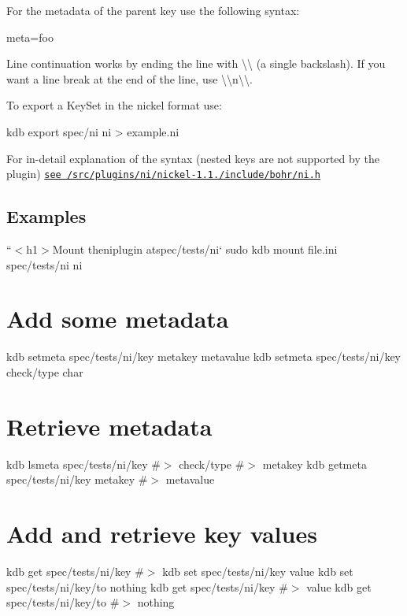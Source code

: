 For the metadata of the parent key use the following syntax\+:


\begin{DoxyCode}
[]
meta=foo
\end{DoxyCode}


Line continuation works by ending the line with {\ttfamily \textbackslash{}\textbackslash{}} (a single backslash). If you want a line break at the end of the line, use {\ttfamily \textbackslash{}\textbackslash{}n\textbackslash{}\textbackslash{}}.

To export a {\ttfamily Key\+Set} in the nickel format use\+:


\begin{DoxyCode}
kdb export spec/ni ni > example.ni
\end{DoxyCode}


For in-\/detail explanation of the syntax (nested keys are not supported by the plugin) \href{/home/markus/Projekte/Elektra/current/src/plugins/ni/nickel-1.1.0/include/bohr/ni.h}{\tt see /src/plugins/ni/nickel-\/1.1./include/bohr/ni.h}

\subsection*{Examples}

``{\ttfamily  $<$h1$>$Mount the}ni{\ttfamily plugin at}spec/tests/ni` sudo kdb mount file.\+ini spec/tests/ni ni

\section*{Add some metadata}

kdb setmeta spec/tests/ni/key metakey metavalue kdb setmeta spec/tests/ni/key check/type char

\section*{Retrieve metadata}

kdb lsmeta spec/tests/ni/key \#$>$ check/type \#$>$ metakey kdb getmeta spec/tests/ni/key metakey \#$>$ metavalue

\section*{Add and retrieve key values}

kdb get spec/tests/ni/key \#$>$ kdb set spec/tests/ni/key value kdb set spec/tests/ni/key/to nothing kdb get spec/tests/ni/key \#$>$ value kdb get spec/tests/ni/key/to \#$>$ nothing

